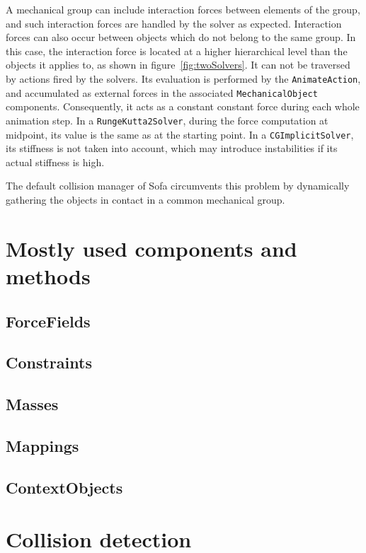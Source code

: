 A mechanical group can include interaction forces between elements of the group, and such interaction forces are handled by the solver as expected.
Interaction forces can also occur between objects which do not belong to the same group.
In this case, the interaction force is located at a higher hierarchical level than the objects it applies to, as shown in figure~\ref{fig:twoSolvers}.
It can not be traversed by actions fired by the solvers.
Its evaluation is performed by the \texttt{AnimateAction}, and accumulated as external forces in the associated \texttt{MechanicalObject} components.
Consequently, it acts as a constant constant force during each whole animation step.
In a \texttt{RungeKutta2Solver}, during the force computation at midpoint, its value is the same as at the starting point.
In a \texttt{CGImplicitSolver}, its stiffness is not taken into account, which may introduce instabilities if its actual stiffness is high.

The default collision manager of Sofa circumvents this problem by dynamically gathering the objects in contact in a common mechanical group.

\section{Mostly used components and methods}
\subsection{ForceFields}
\subsection{Constraints}
\subsection{Masses}
\subsection{Mappings}
\subsection{ContextObjects}

\section{Collision detection} \label{sec:collision}

% 

